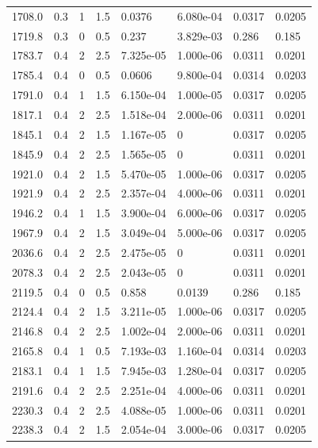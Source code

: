 \documentclass[preview]{standalone}
\begin{document}
{{{\begin{tabular}{L{1.2cm}C{1.2cm} C{0.3cm}C{0.5cm} C{1.4cm}C{1.4cm} C{1.4cm}C{1.4cm}}
  1708.0  &   0.3  & 1     & 1.5 &  0.0376  & 6.080e-04  & 0.0317 &  0.0205   \\ 
  1719.8  &   0.3  & 0     & 0.5 &  0.237  & 3.829e-03  & 0.286 &  0.185   \\ 
  1783.7  &   0.4  & 2     & 2.5 &  7.325e-05  & 1.000e-06  & 0.0311 &  0.0201   \\ 
  1785.4  &   0.4  & 0     & 0.5 &  0.0606  & 9.800e-04  & 0.0314 &  0.0203   \\ 
  1791.0  &   0.4  & 1     & 1.5 &  6.150e-04  & 1.000e-05  & 0.0317 &  0.0205   \\ 
  1817.1  &   0.4  & 2     & 2.5 &  1.518e-04  & 2.000e-06  & 0.0311 &  0.0201   \\ 
  1845.1  &   0.4  & 2     & 1.5 &  1.167e-05  & 0  & 0.0317 &  0.0205   \\ 
  1845.9  &   0.4  & 2     & 2.5 &  1.565e-05  & 0  & 0.0311 &  0.0201   \\ 
  1921.0  &   0.4  & 2     & 1.5 &  5.470e-05  & 1.000e-06  & 0.0317 &  0.0205   \\ 
  1921.9  &   0.4  & 2     & 2.5 &  2.357e-04  & 4.000e-06  & 0.0311 &  0.0201   \\ 
  1946.2  &   0.4  & 1     & 1.5 &  3.900e-04  & 6.000e-06  & 0.0317 &  0.0205   \\ 
  1967.9  &   0.4  & 2     & 1.5 &  3.049e-04  & 5.000e-06  & 0.0317 &  0.0205   \\ 
  2036.6  &   0.4  & 2     & 2.5 &  2.475e-05  & 0  & 0.0311 &  0.0201   \\ 
  2078.3  &   0.4  & 2     & 2.5 &  2.043e-05  & 0  & 0.0311 &  0.0201   \\ 
  2119.5  &   0.4  & 0     & 0.5 &  0.858  & 0.0139  & 0.286 &  0.185   \\ 
  2124.4  &   0.4  & 2     & 1.5 &  3.211e-05  & 1.000e-06  & 0.0317 &  0.0205   \\ 
  2146.8  &   0.4  & 2     & 2.5 &  1.002e-04  & 2.000e-06  & 0.0311 &  0.0201   \\ 
  2165.8  &   0.4  & 1     & 0.5 &  7.193e-03  & 1.160e-04  & 0.0314 &  0.0203   \\ 
  2183.1  &   0.4  & 1     & 1.5 &  7.945e-03  & 1.280e-04  & 0.0317 &  0.0205   \\ 
  2191.6  &   0.4  & 2     & 2.5 &  2.251e-04  & 4.000e-06  & 0.0311 &  0.0201   \\ 
  2230.3  &   0.4  & 2     & 2.5 &  4.088e-05  & 1.000e-06  & 0.0311 &  0.0201   \\ 
  2238.3  &   0.4  & 2     & 1.5 &  2.054e-04  & 3.000e-06  & 0.0317 &  0.0205   \\ 

\end{tabular}}}}
\end{document}
